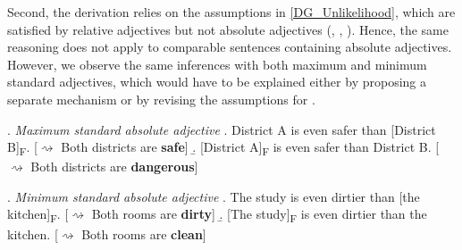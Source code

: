 \documentclass[12pt,letterpaper]{scrartcl}
\newcommand{\alignright}{\hspace*{\fill}}
\newcommand{\infer}{$\rightsquigarrow$ }
\newcommand{\sub}[1]{\textsubscript{#1}}
\begin{document}
Second, %
the derivation relies on the assumptions in \ref{DG_Unlikelihood}, which are satisfied by relative adjectives but not absolute adjectives (\cite{kennedy_vagueness_2007}, \cite{toledo_absolute_2011}, \cite{lassiter_context_2013}). Hence, the same reasoning does not apply to comparable sentences containing absolute adjectives. However, we observe the same inferences with both maximum and minimum standard adjectives, which would have to be explained either by proposing a separate mechanism or by revising the assumptions for \cite{daniels_even_2020}.

\ex.\label{safe} \textit{Maximum standard absolute adjective}
\a. District A is even safer than [District B]\sub{F}. \alignright [\infer Both districts are \textbf{safe}]
\b. [District A]\sub{F} is even safer than District B. \alignright [\infer Both districts are \textbf{dangerous}]

\ex.\label{dirty} \textit{Minimum standard absolute adjective}
\a. The study is even dirtier than [the kitchen]\sub{F}. \alignright [\infer Both rooms are \textbf{dirty}]
\b. [The study]\sub{F} is even dirtier than the kitchen. \alignright [\infer Both rooms are \textbf{clean}]

 
\end{document}
